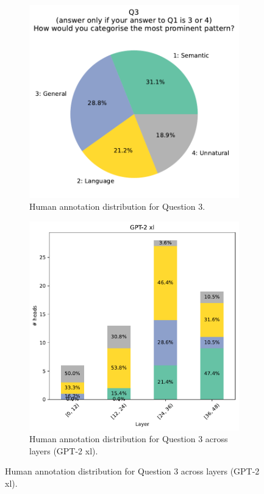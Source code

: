 \documentclass[11pt]{article}
\newcommand{\GPTxl}{GPT-2 xl}
\begin{document}
\begin{figure}[htp]
    \centering
    \begin{subfigure}{\columnwidth}
    \centering
    \includegraphics[scale=0.45]
        {figures/human_validation/q3_pie}
        \caption{Human annotation distribution for Question 3.}
    \end{subfigure}

    \begin{subfigure}{\columnwidth}
        \includegraphics[scale=0.45]
        {figures/human_validation/q3_by_layer_gpt}
        \caption{Human annotation distribution for Question 3 across layers (\GPTxl{}).}
    \end{subfigure}


\end{figure}
\end{document}
